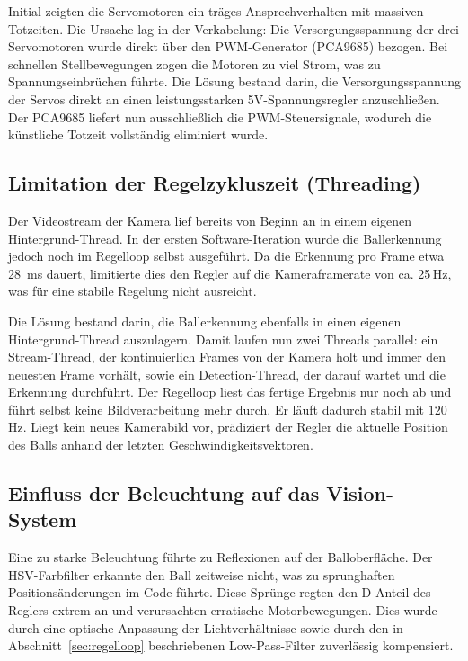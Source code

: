 \documentclass[11pt, a4paper]{scrreprt}
\begin{document}
Initial zeigten die Servomotoren ein träges Ansprechverhalten mit massiven Totzeiten. Die Ursache lag in der Verkabelung: Die Versorgungsspannung der drei Servomotoren wurde direkt über den PWM-Generator (PCA9685) bezogen. Bei schnellen Stellbewegungen zogen die Motoren zu viel Strom, was zu Spannungseinbrüchen führte. Die Lösung bestand darin, die Versorgungsspannung der Servos direkt an einen leistungsstarken 5V-Spannungsregler anzuschließen. Der PCA9685 liefert nun ausschließlich die PWM-Steuersignale, wodurch die künstliche Totzeit vollständig eliminiert wurde.

\subsection{Limitation der Regelzykluszeit (Threading)}

Der Videostream der Kamera lief bereits von Beginn an in einem eigenen Hintergrund-Thread. In der ersten Software-Iteration wurde die Ballerkennung jedoch noch im Regelloop selbst ausgeführt. Da die Erkennung pro Frame etwa \SI{28}{\milli\second} dauert, limitierte dies den Regler auf die Kameraframerate von ca. 25\,Hz, was für eine stabile Regelung nicht ausreicht.

Die Lösung bestand darin, die Ballerkennung ebenfalls in einen eigenen Hintergrund-Thread auszulagern. Damit laufen nun zwei Threads parallel: ein Stream-Thread, der kontinuierlich Frames von der Kamera holt und immer den neuesten Frame vorhält, sowie ein Detection-Thread, der darauf wartet und die Erkennung durchführt. Der Regelloop liest das fertige Ergebnis nur noch ab und führt selbst keine Bildverarbeitung mehr durch. Er läuft dadurch stabil mit $120$\,Hz. Liegt kein neues Kamerabild vor, prädiziert der Regler die aktuelle Position des Balls anhand der letzten Geschwindigkeitsvektoren.

\subsection{Einfluss der Beleuchtung auf das Vision-System}

Eine zu starke Beleuchtung führte zu Reflexionen auf der Balloberfläche. Der HSV-Farbfilter erkannte den Ball zeitweise nicht, was zu sprunghaften Positionsänderungen im Code führte. Diese Sprünge regten den D-Anteil des Reglers extrem an und verursachten erratische Motorbewegungen. Dies wurde durch eine optische Anpassung der Lichtverhältnisse sowie durch den in Abschnitt~\ref{sec:regelloop} beschriebenen Low-Pass-Filter zuverlässig kompensiert.
\end{document}

